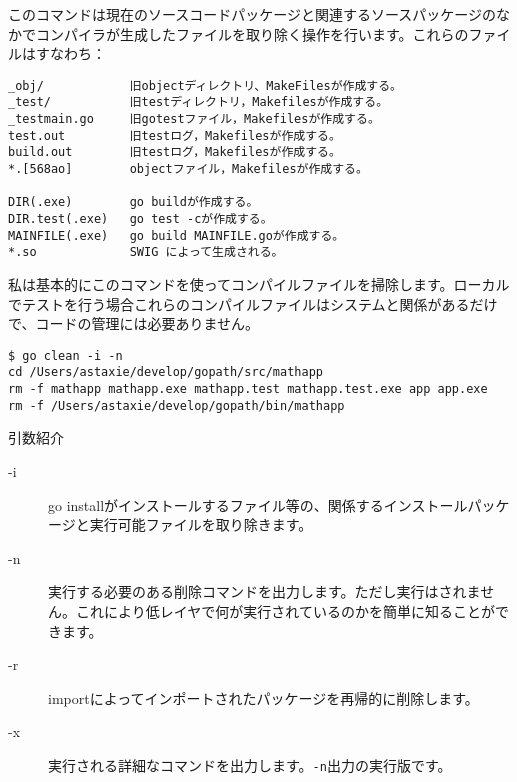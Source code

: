  このコマンドは現在のソースコードパッケージと関連するソースパッケージのなかでコンパイラが生成したファイルを取り除く操作を行います。これらのファイルはすなわち：


\begin{lstlisting}[numbers=none]
_obj/            旧objectディレクトリ、MakeFilesが作成する。
_test/           旧testディレクトリ，Makefilesが作成する。
_testmain.go     旧gotestファイル，Makefilesが作成する。
test.out         旧testログ，Makefilesが作成する。
build.out        旧testログ，Makefilesが作成する。
*.[568ao]        objectファイル，Makefilesが作成する。

DIR(.exe)        go buildが作成する。
DIR.test(.exe)   go test -cが作成する。
MAINFILE(.exe)   go build MAINFILE.goが作成する。
*.so             SWIG によって生成される。
\end{lstlisting}

私は基本的にこのコマンドを使ってコンパイルファイルを掃除します。ローカルでテストを行う場合これらのコンパイルファイルはシステムと関係があるだけで、コードの管理には必要ありません。

\begin{lstlisting}[numbers=none]
$ go clean -i -n
cd /Users/astaxie/develop/gopath/src/mathapp
rm -f mathapp mathapp.exe mathapp.test mathapp.test.exe app app.exe
rm -f /Users/astaxie/develop/gopath/bin/mathapp
\end{lstlisting}

引数紹介

\begin{description}
  \item[-i] go installがインストールするファイル等の、関係するインストールパッケージと実行可能ファイルを取り除きます。
  \item[-n] 実行する必要のある削除コマンドを出力します。ただし実行はされません。これにより低レイヤで何が実行されているのかを簡単に知ることができます。
  \item[-r] importによってインポートされたパッケージを再帰的に削除します。
  \item[-x] 実行される詳細なコマンドを出力します。\texttt{-n}出力の実行版です。
\end{description}
